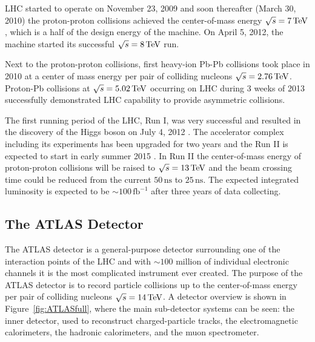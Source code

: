 LHC started to operate on November 23, 2009 and soon thereafter (March 30, 2010)
the proton-proton collisions achieved the center-of-mass energy $\sqrt{s} = 7
\,\text{TeV}$, which is a half of the design energy of the machine. On April 5, 2012, the
machine started its successful $\sqrt{s} = 8 \,\text{TeV}$ run.

Next to the proton-proton collisions, first heavy-ion Pb-Pb collisions took place
in 2010 at a center of mass energy per pair of colliding nucleons $\sqrt{s} =
2.76 \,\text{TeV}$. Proton-Pb collisions at $\sqrt{s} = 5.02 \,\text{TeV}$ occurring on LHC
during 3 weeks of 2013 successfully demonstrated LHC capability to provide
asymmetric collisions.  

The first running period of the LHC, Run I, was very successful and resulted in
the discovery of the Higgs boson on July 4, 2012 \cite{HiggsDiscovery}.  The
accelerator complex including its experiments has been upgraded for two years
and the Run II is expected to start in early summer 2015 \cite{LHCFuture,
LHCFutureLuminosigy}. In Run II the center-of-mass energy of proton-proton
collisions will be raised to $\sqrt{s} = 13 \,\text{TeV}$ and the beam crossing time
could be reduced from the current $50\,\text{ns}$ to $25\,\text{ns}$. The
expected integrated luminosity is expected to be $\sim 100\,\text{fb}^{-1}$
after three years of data collecting.

\subsection{The ATLAS Detector}

The ATLAS detector \cite{ATLAS} is a general-purpose detector surrounding one of
the interaction points of the LHC and with $\sim 100$ million of individual
electronic channels it is the most complicated instrument ever created.
The purpose of the ATLAS detector is to record particle collisions up to the center-of-mass
energy per pair of colliding nucleons $\sqrt{s} = 14 \,\text{TeV}$. A detector overview is
shown in Figure~\ref{fig:ATLASfull}, where the main sub-detector systems can be
seen: the inner detector, used to reconstruct charged-particle tracks, the
electromagnetic calorimeters, the hadronic calorimeters, and the muon
spectrometer. 

